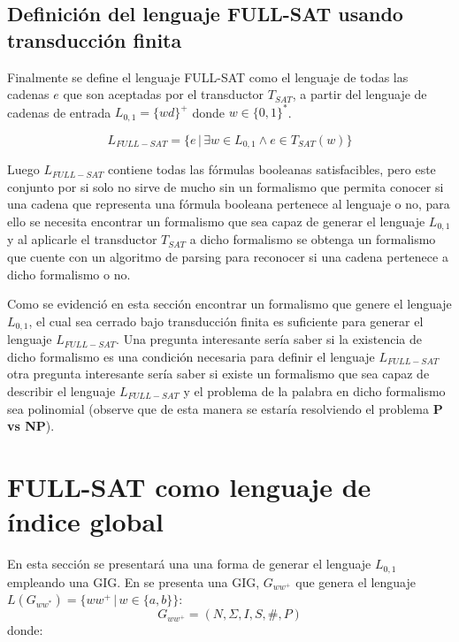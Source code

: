 \documentclass{article}
\begin{document}
\subsection{Definición del lenguaje FULL-SAT usando transducción finita}

Finalmente se define el lenguaje FULL-SAT como el lenguaje de todas las cadenas $e$ que son aceptadas por el transductor $T_{SAT}$, a partir del lenguaje
de cadenas de entrada $L_{0,1}=\{wd\}^+$ donde $w\in \{0,1\}^*$. 

$$L_{FULL-SAT} = \{e\,|\,\exists w \in L_{0,1} \wedge e \in T_{SAT}(w) \}$$

Luego $L_{FULL-SAT}$ contiene todas las fórmulas booleanas satisfacibles, pero este conjunto por si solo no sirve de mucho sin un formalismo
que permita conocer si una cadena que representa una fórmula booleana pertenece al lenguaje o no, para ello se necesita encontrar un formalismo que sea capaz
de generar el lenguaje $L_{0,1}$ y al aplicarle el transductor $T_{SAT}$ a dicho formalismo se obtenga un formalismo que cuente con un algoritmo de parsing
para reconocer si una cadena pertenece a dicho formalismo o no.

Como se evidenció en esta sección encontrar un formalismo que genere el lenguaje $L_{0,1}$, el cual sea cerrado bajo transducción finita
es suficiente para generar el lenguaje $L_{FULL-SAT}$. Una pregunta interesante sería saber si la existencia de dicho formalismo
es una condición necesaria para definir el lenguaje $L_{FULL-SAT}$ otra pregunta interesante sería saber si existe un formalismo
que sea capaz de describir el lenguaje $L_{FULL-SAT}$ y el problema de la palabra en dicho formalismo sea polinomial (observe que de esta manera
se estaría resolviendo el problema \textbf{P vs NP}).

\section{FULL-SAT como lenguaje de índice global}

En esta sección se presentará una una forma de generar el lenguaje $L_{0,1}$ empleando una GIG. En \cite{globalIndexLanguages} se presenta
una GIG, $G_{ww^+}$ que genera el lenguaje $L(G_{ww^*})=\{ww^+\,|\,w\in\{a,b\}\}$: 
$$
    G_{ww^+} = (N, \Sigma, I, S, \#, P) 
$$
donde:
\end{document}
